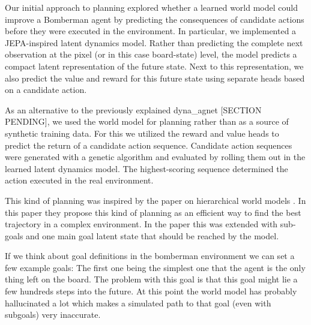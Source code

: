 \documentclass[article, 10pt]{IEEEtran}
\begin{document}





Our initial approach to planning explored whether a learned world model could improve a Bomberman agent by predicting the consequences of candidate actions before they were executed in the environment. In particular, we implemented a JEPA-inspired latent dynamics model. Rather than predicting the complete next observation at the pixel (or in this case board-state) level, the model predicts a compact latent representation of the future state. Next to this representation, we also predict the value and reward for this future state using separate heads based on a candidate action. 

As an alternative to the previously explained dyna\_agnet [SECTION PENDING], we used the world model for planning rather than as a source of synthetic training data. For this we utilized the reward and value heads to predict the return of a candidate action sequence. Candidate action sequences were generated with a genetic algorithm and evaluated by rolling them out in the learned latent dynamics model. The highest-scoring sequence determined the action executed in the real environment. 

This kind of planning was inspired by the paper on hierarchical world models \cite{zhang2026hwm}. In this paper they propose this kind of planning as an efficient way to find the best trajectory in a complex environment. In the paper this was extended with sub-goals and one main goal latent state that should be reached by the model. 

If we think about goal definitions in the bomberman environment we can set a few example goals: The first one being the simplest one that the agent is the only thing left on the board. The problem with this goal is that this goal might lie a few hundreds steps into the future. At this point the world model has probably hallucinated a lot which makes a simulated path to that goal (even with subgoals) very inaccurate. 
\end{document}
